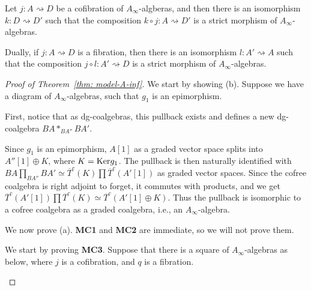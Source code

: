 \documentclass[../thesis.tex]{subfiles}
\begin{document}
        \begin{lemma}\label{lem: strict-replacement}
            Let $j: A \rightsquigarrow D$ be a cofibration of $A_\infty$-algberas, and then there is an isomorphism $k: D\rightsquigarrow D'$ such that the composition $k\circ j: A \rightsquigarrow D'$ is a strict morphism of $A_\infty$-algebras.

            Dually, if $j: A \rightsquigarrow D$ is a fibration, then there is an isomorphism $l: A' \rightsquigarrow A$ such that the composition $j\circ l: A' \rightsquigarrow D$ is a strict morphism of $A_\infty$-algebras.
        \end{lemma}

        \begin{proof}[Proof of Theorem~\ref{thm: model-A-inf}]
            We start by showing (b). Suppose we have a diagram of $A_\infty$-algebras, such that $g_1$ is an epimorphism.
            \begin{center}
            \end{center}
            First, notice that as dg-coalgebras, this pullback exists and defines a new dg-coalgebra $BA \ast_{BA''}BA'$.

            Since $g_1$ is an epimorphism, $A[1]$ as a graded vector space splits into $A''[1] \oplus K$, where $K = \tt{Ker}g_1$. The pullback is then naturally identified with $BA \prod_{BA''}BA' \simeq \overline{T}^c(K)\prod \overline{T}^c(A'[1])$ as graded vector spaces. Since the cofree coalgebra is right adjoint to forget, it commutes with products, and we get $\overline{T}^c(A'[1])\prod \overline{T}^c(K) \simeq \overline{T}^c(A'[1]\oplus K)$. Thus the pullback is isomorphic to a cofree coalgebra as a graded coalgebra, i.e., an $A_\infty$-algebra.

            We now prove (a). \textbf{MC1} and \textbf{MC2} are immediate, so we will not prove them.

            We start by proving \textbf{MC3}. Suppose that there is a square of $A_\infty$-algebras as below, where $j$ is a cofibration, and $q$ is a fibration.
            \begin{center}
            \end{center}


\end{proof}
\end{document}
